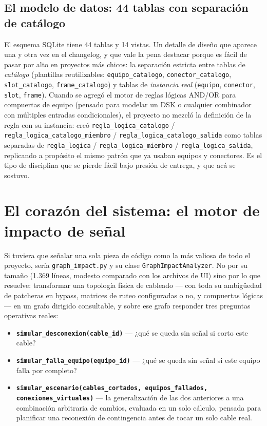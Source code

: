 \documentclass[11pt,twocolumn]{article}
\begin{document}
\subsection{El modelo de datos: 44 tablas con separación de catálogo}

El esquema SQLite tiene 44 tablas y 14 vistas. Un detalle de diseño que aparece una y otra vez en el changelog, y que vale la pena destacar porque es fácil de pasar por alto en proyectos más chicos: la separación estricta entre tablas de \emph{catálogo} (plantillas reutilizables: \texttt{equipo\_catalogo}, \texttt{conector\_catalogo}, \texttt{slot\_catalogo}, \texttt{frame\_catalogo}) y tablas de \emph{instancia real} (\texttt{equipo}, \texttt{conector}, \texttt{slot}, \texttt{frame}). Cuando se agregó el motor de reglas lógicas AND/OR para compuertas de equipo (pensado para modelar un DSK o cualquier combinador con múltiples entradas condicionales), el proyecto no mezcló la definición de la regla con su instancia: creó \texttt{regla\_logica\_catalogo} / \texttt{regla\_logica\_catalogo\_miembro} / \texttt{regla\_logica\_catalogo\_salida} como tablas separadas de \texttt{regla\_logica} / \texttt{regla\_logica\_miembro} / \texttt{regla\_logica\_salida}, replicando a propósito el mismo patrón que ya usaban equipos y conectores. Es el tipo de disciplina que se pierde fácil bajo presión de entrega, y que acá se sostuvo.

\section{El corazón del sistema: el motor de impacto de señal}

Si tuviera que señalar una sola pieza de código como la más valiosa de todo el proyecto, sería \texttt{graph\_impact.py} y su clase \texttt{GraphImpactAnalyzer}. No por su tamaño (1.369 líneas, modesto comparado con los archivos de UI) sino por lo que resuelve: transformar una topología física de cableado --- con toda su ambigüedad de patcheras en bypass, matrices de ruteo configuradas o no, y compuertas lógicas --- en un grafo dirigido consultable, y sobre ese grafo responder tres preguntas operativas reales:

\begin{itemize}[leftmargin=1.1em]
\item \textbf{\texttt{simular\_desconexion(cable\_id)}} --- ¿qué se queda sin señal si corto este cable?
\item \textbf{\texttt{simular\_falla\_equipo(equipo\_id)}} --- ¿qué se queda sin señal si este equipo falla por completo?
\item \textbf{\texttt{simular\_escenario(cables\_cortados, equipos\_fallados, conexiones\_virtuales)}} --- la generalización de las dos anteriores a una combinación arbitraria de cambios, evaluada en un solo cálculo, pensada para planificar una reconexión de contingencia antes de tocar un solo cable real.
\end{itemize}
\end{document}
